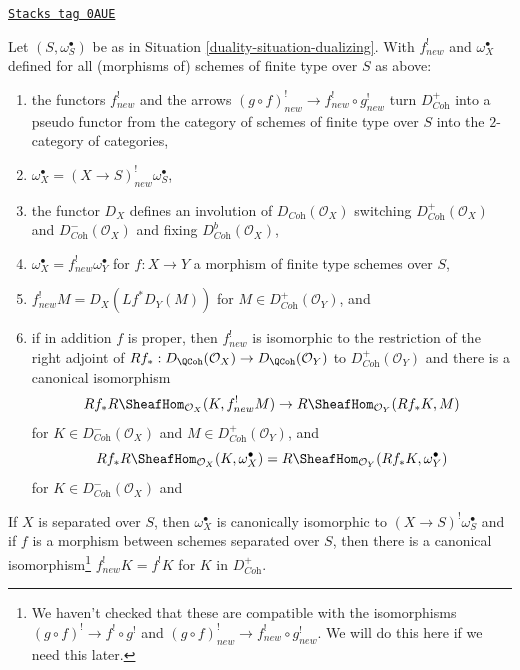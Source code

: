 \begin{lemma}
\label{duality-lemma-duality-bootstrap}
\href{https://stacks.math.columbia.edu/tag/0AUE}{\texttt{Stacks tag 0AUE}}

Let $(S, \omega_S^\bullet)$ be as in Situation \ref{duality-situation-dualizing}.
With $f^!_{new}$ and $\omega_X^\bullet$ defined for all (morphisms of)
schemes of finite type over $S$ as above:
\begin{enumerate}
\item the functors $f^!_{new}$ and the arrows
$(g \circ f)^!_{new} \to f^!_{new} \circ g^!_{new}$
turn $D_{\textit{Coh}}^+$ into a pseudo functor from the category of
schemes of finite type over $S$ into the $2$-category of categories,
\item $\omega_X^\bullet = (X \to S)^!_{new} \omega_S^\bullet$,
\item the functor $D_X$
defines an involution of $D_{\textit{Coh}}(\mathcal{O}_X)$
switching $D_{\textit{Coh}}^+(\mathcal{O}_X)$ and
$D_{\textit{Coh}}^-(\mathcal{O}_X)$ and fixing
$D_{\textit{Coh}}^b(\mathcal{O}_X)$,
\item $\omega_X^\bullet = f^!_{new}\omega_Y^\bullet$ for
$f : X \to Y$ a morphism of finite type schemes over $S$,
\item $f^!_{new}M = D_X(Lf^*D_Y(M))$ for
$M \in D_{\textit{Coh}}^+(\mathcal{O}_Y)$, and
\item if in addition $f$ is proper, then $f^!_{new}$ is isomorphic
to the restriction of the right adjoint of
$Rf_* : D_\QCoh(\mathcal{O}_X) \to D_\QCoh(\mathcal{O}_Y)$ to
$D_{\textit{Coh}}^+(\mathcal{O}_Y)$ and there is a canonical isomorphism
$$
Rf_*R\SheafHom_{\mathcal{O}_X}(K, f^!_{new}M)
\to
R\SheafHom_{\mathcal{O}_Y}(Rf_*K, M)
$$
for $K \in D^-_{\textit{Coh}}(\mathcal{O}_X)$ and
$M \in D_{\textit{Coh}}^+(\mathcal{O}_Y)$, and
$$
Rf_*R\SheafHom_{\mathcal{O}_X}(K, \omega_X^\bullet) =
R\SheafHom_{\mathcal{O}_Y}(Rf_*K, \omega_Y^\bullet)
$$
for $K \in D^-_{\textit{Coh}}(\mathcal{O}_X)$ and
\end{enumerate}
If $X$ is separated over $S$, then
$\omega_X^\bullet$ is canonically isomorphic to
$(X \to S)^!\omega_S^\bullet$ and
if $f$ is a morphism between schemes separated
over $S$, then there is a canonical isomorphism\footnote{We haven't
checked that these are compatible with the isomorphisms
$(g \circ f)^! \to f^! \circ g^!$ and
$(g \circ f)^!_{new} \to f^!_{new} \circ g^!_{new}$. We will do this
here if we need this later.}
$f_{new}^!K = f^!K$ for $K$ in $D_{\textit{Coh}}^+$.
\end{lemma}

